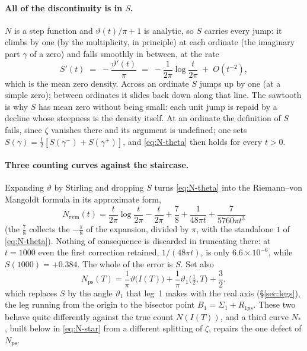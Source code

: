 \documentclass[11pt]{article}
\theoremstyle{definition}
\begin{document}
\paragraph{All of the discontinuity is in $S$.} $N$ is a step function and
$\vartheta(t)/\pi+1$ is analytic, so $S$ carries every jump: it climbs by one
(by the multiplicity, in principle) at each ordinate (the imaginary part
$\gamma$ of a zero) and falls smoothly in between, at the rate
\begin{equation}\label{eq:S-slope}
S'(t) \;=\; -\frac{\vartheta'(t)}{\pi} \;=\; -\frac{1}{2\pi}\log\frac{t}{2\pi}
\;+\;O(t^{-2}),
\end{equation}
which is the mean zero density. Across an ordinate $S$ jumps up by one (at a
simple zero);
between ordinates it slides back down along that line. The sawtooth is why $S$ has mean zero without being small: each unit jump is
repaid by a decline whose steepness is the density itself. At an ordinate the
definition of $S$ fails, since $\zeta$ vanishes there and its argument is
undefined; one sets $S(\gamma)=\tfrac12[S(\gamma^{-})+S(\gamma^{+})]$, and
\eqref{eq:N-theta} then holds for every $t>0$.

\paragraph{Three counting curves against the staircase.} Expanding $\vartheta$ by
Stirling and dropping $S$ turns \eqref{eq:N-theta} into the Riemann--von
Mangoldt formula in its approximate form,
\begin{equation}\label{eq:N-rvm}
N_{\mathrm{rvm}}(t)
=\frac{t}{2\pi}\log\frac{t}{2\pi}-\frac{t}{2\pi}+\frac78
+\frac{1}{48\pi t}+\frac{7}{5760\pi t^{3}}
\end{equation}
(the $\tfrac78$ collects the $-\tfrac\pi8$ of the expansion, divided by $\pi$,
with the standalone $1$ of \eqref{eq:N-theta}). Nothing of consequence is
discarded in truncating there: at $t=1000$ even the first correction retained,
$1/(48\pi t)$, is only $6.6\times10^{-6}$, while $S(1000)=+0.384$. The whole of
the error is $S$. Set also
\begin{equation}\label{eq:N-ps}
N_{\mathrm{ps}}(T)
=\frac{1}{\pi}\vartheta\bigl(I(T)\bigr)
+\frac{1}{\pi}\vartheta_1\bigl(\tfrac12,T\bigr)+\frac32 ,
\end{equation}
which replaces $S$ by the angle $\vartheta_1$ that leg~1 makes with the real
axis (\S\ref{sec:legs}), the leg running from the origin to the bisector point
$B_1=\Sigma_1+R_{1ps}$. These two behave quite differently against the true
count $N(I(T))$, and a third curve $N_{\ast}$, built below in
\eqref{eq:N-star} from a different splitting of $\zeta$, repairs the one defect
of $N_{\mathrm{ps}}$.
\end{document}
